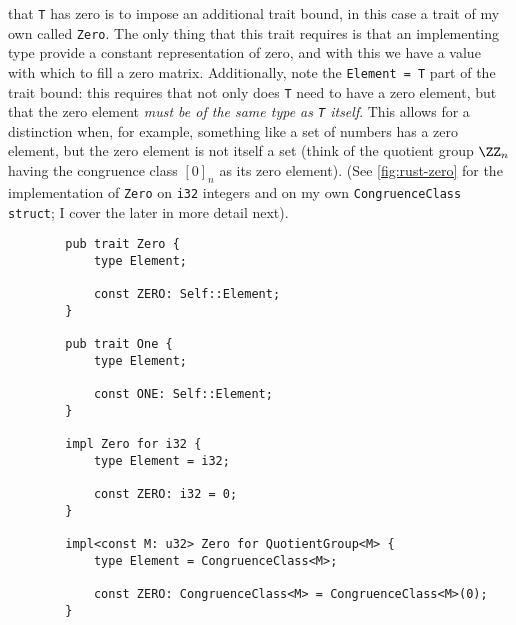 \documentclass{report}
\newenvironment{code}{\captionsetup{type=listing}}{}
\begin{document}
that \Verb+T+ has zero is to impose an additional trait bound, in this case a
trait of my own called \Verb+Zero+. The only thing that this trait requires is
that an implementing type provide a constant representation of zero, and with
this we have a value with which to fill a zero matrix. Additionally, note the
\Verb+Element = T+ part of the trait bound: this requires that not only
does \Verb+T+ need to have a zero element, but that the zero element \emph{must
be of the same type as \Verb+T+ itself}. This allows for a distinction when, for
example, something like a set of numbers has a zero element, but the zero
element is not itself a set (think of the quotient group $\ZZ_n$ having the
congruence class $[0]_n$ as its zero element).
(See \cref{fig:rust-zero}
for the implementation of \Verb+Zero+ on \Verb+i32+ integers and on my own
\Verb+CongruenceClass+ \Verb+struct+; I cover the later in more detail
next).
\begin{code}
    \begin{verbatim}
        pub trait Zero {
            type Element;

            const ZERO: Self::Element;
        }

        pub trait One {
            type Element;

            const ONE: Self::Element;
        }

        impl Zero for i32 {
            type Element = i32;

            const ZERO: i32 = 0;
        }

        impl<const M: u32> Zero for QuotientGroup<M> {
            type Element = CongruenceClass<M>;

            const ZERO: CongruenceClass<M> = CongruenceClass<M>(0);
        }
    \end{verbatim}
    \caption{%
        Definition of the zero and one traits, and the implementation of zero
        for the 32-bit integer type, and for my own quotient group type.
    }
    \label{fig:rust-zero}
\end{code}
\end{document}
